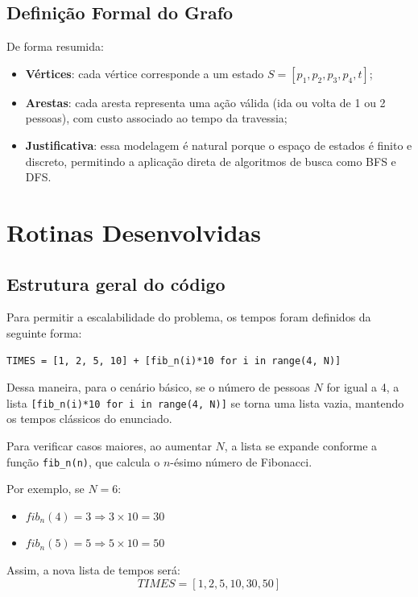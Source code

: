 \documentclass[12pt,a4paper]{article}
\begin{document}
\subsection{Definição Formal do Grafo}
De forma resumida:
\begin{itemize}
\item \textbf{Vértices}: cada vértice corresponde a um estado $S = [p_1, p_2, p_3, p_4, t]$;
\item \textbf{Arestas}: cada aresta representa uma ação válida (ida ou volta de 1 ou 2 pessoas), com custo associado ao tempo da travessia;
\item \textbf{Justificativa}: essa modelagem é natural porque o espaço de estados é finito e discreto, permitindo a aplicação direta de algoritmos de busca como BFS e DFS.
\end{itemize}

\section{Rotinas Desenvolvidas}

\subsection{Estrutura geral do código}

Para permitir a escalabilidade do problema, os tempos foram definidos da seguinte forma:

\begin{lstlisting}
TIMES = [1, 2, 5, 10] + [fib_n(i)*10 for i in range(4, N)]
\end{lstlisting}

Dessa maneira, para o cenário básico, se o número de pessoas $N$ for igual a 4, a lista
\texttt{[fib\_n(i)*10 for i in range(4, N)]} se torna uma lista vazia, mantendo os tempos clássicos do enunciado.

Para verificar casos maiores, ao aumentar $N$, a lista se expande conforme a função \texttt{fib\_n(n)}, que calcula o $n$-ésimo número de Fibonacci.

Por exemplo, se $N = 6$:
\begin{itemize}
    \item $fib_n(4) = 3 \Rightarrow 3 \times 10 = 30$
    \item $fib_n(5) = 5 \Rightarrow 5 \times 10 = 50$
\end{itemize}

Assim, a nova lista de tempos será:
\[
TIMES = [1, 2, 5, 10, 30, 50]
\]
\end{document}
